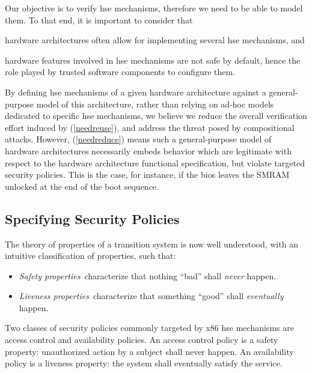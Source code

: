 Our objective is to verify \ac{hse} mechanisms, therefore we need to be able to
model them.
%
To that end, it is important to consider that
%
\begin{inparaenum}[(1)]
\item \label{needreuse}%
  hardware architectures often allow for implementing several \ac{hse}
  mechanisms, and
\item \label{needreduce}%
  hardware features involved in \ac{hse} mechanisms are not safe by default,
  hence the role played by trusted software components to configure them.
\end{inparaenum}
%
By defining \ac{hse} mechanisms of a given hardware architecture against a
general-purpose model of this architecture, rather than relying on ad-hoc models
dedicated to specific \ac{hse} mechanisms, we believe we reduce the overall
verification effort induced by (\ref{needreuse}), and address the threat posed
by compositional attacks.
%
However, (\ref{needreduce}) means such a general-purpose model of hardware
architectures necessarily embeds behavior which are legitimate with respect to
the hardware architecture functional specification, but violate targeted
security policies.
%
This is the case, for instance, if the \ac{bios} leaves the SMRAM unlocked at
the end of the boot sequence.

\subsection{Specifying Security Policies}
\label{subsec:sota:security}

The theory of properties of a transition system is now well understood, with an
intuitive classification of properties, such that:
%
\begin{itemize}
\item \emph{Safety properties}\,\cite{lamport1977proving,lamport1985logical}
  characterize that nothing ``bad'' shall \emph{never} happen.
\item \emph{Liveness properties}\,\cite{lamport1985logical,alpern1985liveness}
  characterize that something ``good'' shall \emph{eventually} happen.
\end{itemize}

Two classes of security policies commonly targeted by x86 \ac{hse} mechanisms
are access control and availability policies.
%
An access control policy is a safety property: unauthorized action by a subject
shall never happen.
%
An availability policy is a liveness property: the system shall eventually
satisfy the service.

